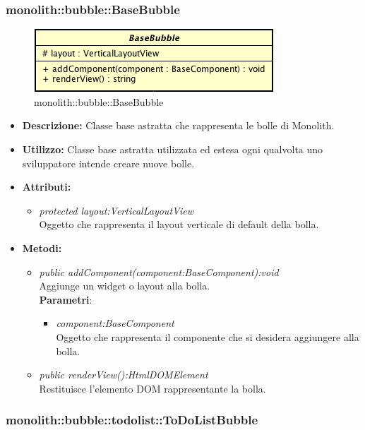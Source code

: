 \subsubsection{monolith::bubble::BaseBubble}

\label{monolith::bubble::BaseBubble}
\begin{figure}[H]
	\centering
	\includegraphics[scale=0.5]{Sezioni/SottosezioniST/img/BaseBubble.png}
	\caption{monolith::bubble::BaseBubble}
\end{figure}

\begin{itemize}
\item \textbf{Descrizione:} Classe base astratta che rappresenta le bolle di Monolith.
\item \textbf{Utilizzo:} Classe base astratta utilizzata ed estesa ogni qualvolta uno sviluppatore intende creare nuove bolle.
\item \textbf{Attributi:} 
\begin{itemize}
\item \textit{protected layout:VerticalLayoutView}\\
Oggetto che rappresenta il layout verticale di default della bolla.
\end{itemize}
\item \textbf{Metodi:}
\begin{itemize}
	\item \textit{public addComponent(component:BaseComponent):void}\\
Aggiunge un widget o layout alla bolla.
		  \\ \textbf{Parametri}: \begin{itemize}
				\item \textit{component:BaseComponent}\\
					Oggetto che rappresenta il componente che si desidera aggiungere alla bolla.
			\end{itemize}
	\item \textit{public renderView():HtmlDOMElement}\\
Restituisce l'elemento DOM rappresentante la bolla.
\end{itemize}
\end{itemize}

\subsubsection{monolith::bubble::todolist::ToDoListBubble}

